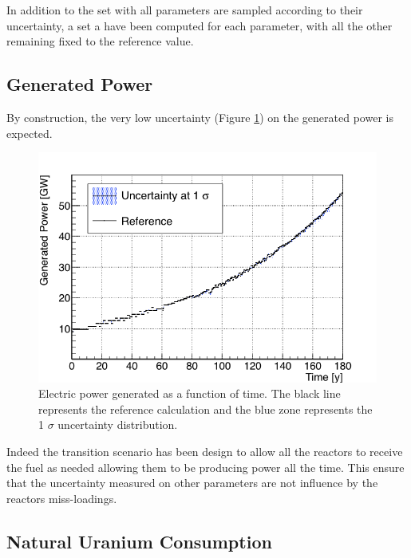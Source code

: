 \documentclass{anstrans}
\begin{document}
In addition to the set with all parameters are sampled according to their
uncertainty, a set a have been computed for each parameter, with all the other
remaining fixed to the reference value.


\subsection{Generated Power}
By construction, the very low uncertainty (Figure \ref{fig:power_full}) on the
generated power is expected. 

\begin{figure}[ht] %
    \centering
    \includegraphics[scale=0.35]{power_full}
    \caption{Electric power generated as a function of time. The black line
        represents the reference calculation and the blue zone
        represents the 1 $\sigma$ uncertainty distribution.}\label{fig:power_full}
\end{figure}

Indeed the transition scenario has been design to allow all the reactors to
receive the fuel as needed allowing them to be producing power all the time.
This ensure that the uncertainty measured on other parameters are not influence
by the reactors miss-loadings.


\subsection{Natural Uranium Consumption}
\end{document}
